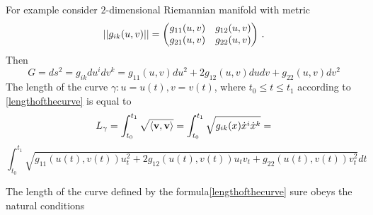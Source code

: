 \documentclass[12pt]{article}
\theoremstyle{theorem}
\numberwithin{equation}{section}
\begin{document}
       For example consider $2$-dimensional Riemannian manifold with metric
                    $$
                 ||g_{ik}(u,v)||=
                     \begin{pmatrix}
                     g_{11}(u,v) &g_{12}(u,v)\cr
                     g_{21}(u,v) &g_{22}(u,v)\cr
                    \end{pmatrix}\,.
                    $$
        Then
                           $$
            G=ds^2=g_{ik}du^idv^k=g_{11}(u,v)du^2+2g_{12}(u,v)dudv+g_{22}(u,v)dv^2
                         $$
                The length of the curve $\gamma\colon u=u(t),v=v(t)$, where $t_0\leq t\leq t_1$
                according to \eqref{lengthofthecurve} is equal to
\begin{equation}\label{lengthofthecurve4}
  L_\gamma=\int_{t_0}^{t_1} \sqrt {\langle{\bf v},{\bf v}\rangle}=
  \int_{t_0}^{t_1} \sqrt {g_{ik}(x)\dot x^i \dot x^k}=
  \end{equation}
  \begin{equation}
\int_{t_0}^{t_1}
\sqrt {{g_{11}}\left(u\left(t\right),v\left(t\right)\right)u_t^2
+2{g_{12}}\left(u\left(t\right),v\left(t\right)\right)u_tv_t+
{g_{22}}\left(u\left(t\right),v\left(t\right)\right)v_t^2}dt
\end{equation}

The length of the curve defined by the formula\eqref{lengthofthecurve}
sure obeys the natural conditions
\end{document}
